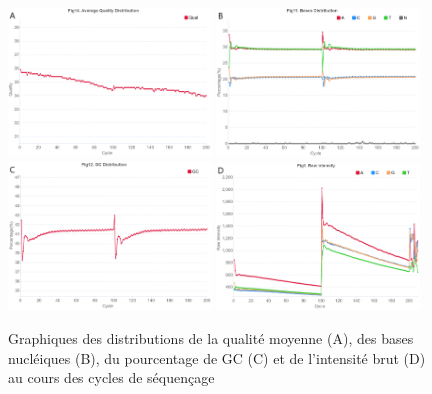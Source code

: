 \begin{figure}[H]
    \centering
    \includegraphics[width=0.48\textwidth]{img/mean_quality.png}
    \includegraphics[width=0.48\textwidth]{img/bases_content.png}\\
    \includegraphics[width=0.48\textwidth]{img/GC_content.png}
    \includegraphics[width=0.48\textwidth]{img/raw_intensity.png}
    \caption{\footnotesize{Graphiques des distributions de la qualité moyenne (A), des bases nucléiques (B), du pourcentage de GC (C) et de l'intensité brut (D) au cours des cycles de séquençage}}
    \label{Graph-rapport-pistes}
\end{figure}

